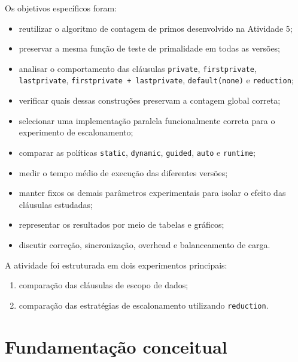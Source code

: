 Os objetivos específicos foram:

\begin{itemize}
    \item reutilizar o algoritmo de contagem de primos desenvolvido na
    Atividade 5;

    \item preservar a mesma função de teste de primalidade em todas as
    versões;

    \item analisar o comportamento das cláusulas
    \texttt{private},
    \texttt{firstprivate},
    \texttt{lastprivate},
    \texttt{firstprivate + lastprivate},
    \texttt{default(none)} e
    \texttt{reduction};

    \item verificar quais dessas construções preservam a contagem global
    correta;

    \item selecionar uma implementação paralela funcionalmente correta para
    o experimento de escalonamento;

    \item comparar as políticas
    \texttt{static},
    \texttt{dynamic},
    \texttt{guided},
    \texttt{auto} e
    \texttt{runtime};

    \item medir o tempo médio de execução das diferentes versões;

    \item manter fixos os demais parâmetros experimentais para isolar o
    efeito das cláusulas estudadas;

    \item representar os resultados por meio de tabelas e gráficos;

    \item discutir correção, sincronização, overhead e balanceamento de
    carga.
\end{itemize}

A atividade foi estruturada em dois experimentos principais:

\begin{enumerate}
    \item comparação das cláusulas de escopo de dados;
    \item comparação das estratégias de escalonamento utilizando
    \texttt{reduction}.
\end{enumerate}


\section{Fundamentação conceitual}
\label{sec:atvd07-fundamentacao}

